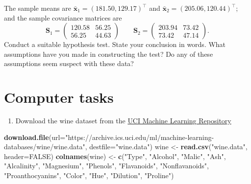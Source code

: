 \documentclass[]{book}
\newenvironment{Shaded}{\begin{snugshade}}{\end{snugshade}}
\newcommand{\DataTypeTok}[1]{\textcolor[rgb]{0.13,0.29,0.53}{#1}}
\newcommand{\KeywordTok}[1]{\textcolor[rgb]{0.13,0.29,0.53}{\textbf{#1}}}
\newcommand{\NormalTok}[1]{#1}
\newcommand{\OtherTok}[1]{\textcolor[rgb]{0.56,0.35,0.01}{#1}}
\newcommand{\StringTok}[1]{\textcolor[rgb]{0.31,0.60,0.02}{#1}}
\providecommand{\tightlist}{%
  \setlength{\itemsep}{0pt}\setlength{\parskip}{0pt}}
\theoremstyle{definition}
\theoremstyle{definition}
\theoremstyle{definition}
\theoremstyle{remark}
\begin{document}
\begin{enumerate}
  The sample means are \(\bar{\mathbf x}_1 = (181.50,129.17)^\top\) and \(\bar{\mathbf x}_2 = (205.06,120.44)^\top\); and the sample covariance matrices are
  \[\mathbf S_1 = \begin{pmatrix} 120.58 & 56.25 \\ 56.25 & 44.63 \end{pmatrix} \qquad
  \mathbf S_2 = \begin{pmatrix} 203.94 & 73.42 \\ 73.42 & 47.14 \end{pmatrix}.\]
  Conduct a suitable hypothesis test. State your conclusion in words. What assumptions have you made in constructing the test? Do any of these assumptions seem suspect with these data?
\end{enumerate}

\hypertarget{computer-tasks-3}{%
\section{Computer tasks}\label{computer-tasks-3}}

\begin{enumerate}
\def\labelenumi{\arabic{enumi}.}
\tightlist
\item
  Download the wine dataset from the \href{https://archive.ics.uci.edu/ml/datasets/wine}{UCI Machine Learning Repository}
\end{enumerate}

\begin{Shaded}
\begin{Highlighting}[]
\KeywordTok{download.file}\NormalTok{(}\DataTypeTok{url=}\StringTok{"https://archive.ics.uci.edu/ml/machine-learning-databases/wine/wine.data"}\NormalTok{, }\DataTypeTok{destfile=}\StringTok{"wine.data"}\NormalTok{)}
\NormalTok{wine <-}\StringTok{ }\KeywordTok{read.csv}\NormalTok{(}\StringTok{"wine.data"}\NormalTok{, }\DataTypeTok{header=}\OtherTok{FALSE}\NormalTok{)}
\KeywordTok{colnames}\NormalTok{(wine) <-}\StringTok{ }\KeywordTok{c}\NormalTok{(}\StringTok{"Type"}\NormalTok{, }\StringTok{"Alcohol"}\NormalTok{, }\StringTok{"Malic"}\NormalTok{,}
\StringTok{"Ash"}\NormalTok{,}
\StringTok{"Alcalinity"}\NormalTok{,}
\StringTok{"Magnesium"}\NormalTok{,}
\StringTok{"Phenols"}\NormalTok{,}
\StringTok{"Flavanoids"}\NormalTok{,}
\StringTok{"Nonflavanoids"}\NormalTok{,}
\StringTok{"Proanthocyanins"}\NormalTok{,}
\StringTok{"Color"}\NormalTok{,}
\StringTok{"Hue"}\NormalTok{,}
\StringTok{"Dilution"}\NormalTok{,}
\StringTok{"Proline"}\NormalTok{)}
\end{Highlighting}
\end{Shaded}
\end{document}
